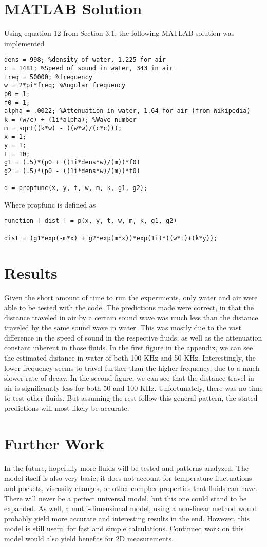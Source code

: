 \documentclass{article}
\begin{document}
\section{MATLAB Solution} 
Using equation 12 from Section 3.1, the following MATLAB solution was implemented

\begin{lstlisting}
dens = 998; %density of water, 1.225 for air
c = 1481; %Speed of sound in water, 343 in air
freq = 50000; %frequency
w = 2*pi*freq; %Angular frequency
p0 = 1;
f0 = 1;
alpha = .0022; %Attenuation in water, 1.64 for air (from Wikipedia)
k = (w/c) + (1i*alpha); %Wave number
m = sqrt((k*w) - ((w*w)/(c*c)));
x = 1;
y = 1;
t = 10;
g1 = (.5)*(p0 + ((1i*dens*w)/(m))*f0)
g2 = (.5)*(p0 - ((1i*dens*w)/(m))*f0)

d = propfunc(x, y, t, w, m, k, g1, g2);
\end{lstlisting}
\newpage
Where propfunc is defined as
\begin{lstlisting}
function [ dist ] = p(x, y, t, w, m, k, g1, g2)

dist = (g1*exp(-m*x) + g2*exp(m*x))*exp(1i)*((w*t)+(k*y));
\end{lstlisting}

\section{Results}
Given the short amount of time to run the experiments, only water and air were able to be tested with the code.
The predictions made were correct, in that the distance traveled in air by a certain sound wave was much less
than the distance traveled by the same sound wave in water. This was mostly due to the vast difference in the
speed of sound in the respective fluids, as well as the attenuation constant inherent in those fluids. In the first figure in the appendix,
we can see the estimated distance in water of both 100 KHz and 50 KHz. Interestingly, the lower frequency seems
to travel further than the higher frequency, due to a much slower rate of decay. In the second figure, we can see that the
distance travel in air is significantly less for both 50 and 100 KHz. Unfortunately, there was no time to test other
fluids. But assuming the rest follow this general pattern, the stated predictions will most likely be accurate.


\section{Further Work}
In the future, hopefully more fluids will be tested and patterns analyzed. The model itself is also very basic;
it does not account for temperature fluctuations and pockets, viscosity changes, or other complex properties
that fluids can have. There will never be a perfect universal model, but this one could stand to be expanded.
As well, a mutli-dimensional model, using a non-linear method would probably yield more accurate and interesting
results in the end. However, this model is still useful for fast and simple calculations. Continued work on this
model would also yield benefits for 2D measurements. 
\end{document}
